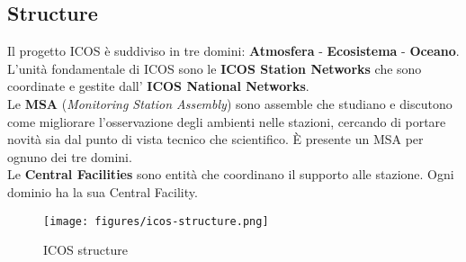 \subsection{Structure}

Il progetto ICOS è suddiviso in tre domini: \textbf{Atmosfera} - \textbf{Ecosistema} - \textbf{Oceano}. \\

L'unità fondamentale di ICOS sono le \textbf{ICOS Station Networks} che sono coordinate e gestite dall'
\textbf{ICOS National Networks}. \\

Le \textbf{MSA} (\textit{Monitoring Station Assembly}) sono assemble che studiano e discutono come migliorare
l'osservazione degli ambienti nelle stazioni, cercando di portare novità sia dal punto di vista tecnico che scientifico.
È presente un MSA per ognuno dei tre domini. \\

Le \textbf{Central Facilities} sono entità che coordinano il supporto alle stazione. Ogni dominio ha la sua Central Facility. \\

\begin{figure}[H]
    \caption{ICOS structure}
    \centering
    \texttt{[image: figures/icos-structure.png]}
\end{figure}